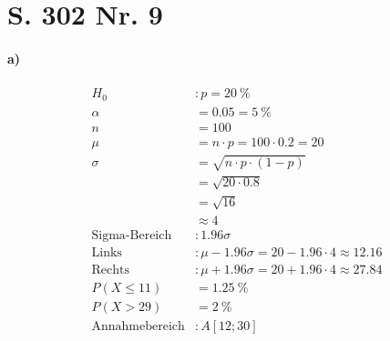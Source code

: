 \documentclass[12pt,a4paper]{report}
\begin{document}
	\section{S. 302 Nr. 9}
	\paragraph{a)}
	\begin{align*}
		H_0 &: p= 20 \ \% \\
		\alpha &= 0.05 = 5\ \% \\
		n &= 100 \\
		\mu &= n \cdot p = 100 \cdot 0.2 = 20 \\
		\sigma &= \sqrt{n\cdot p\cdot (1-p)} \\
		&= \sqrt{20 \cdot 0.8} \\
		&= \sqrt{16} \\
		&\approx 4 \\
		\text{Sigma-Bereich}&: 1.96\sigma \\
		\text{Links}&: \mu - 1.96\sigma = 20 - 1.96\cdot 4 \approx 12.16 \\
		\text{Rechts}&: \mu + 1.96\sigma = 20 + 1.96\cdot 4 \approx 27.84 \\
		P(X \leq 11)&= 1.25\ \% \\
		P(X > 29) &= 2\ \% \\
		\text{Annahmebereich}&: A[12;30]
	\end{align*}
\end{document}

